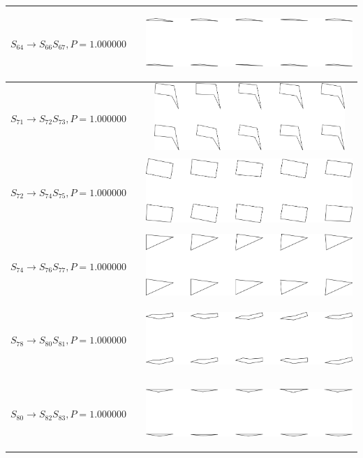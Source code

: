 \begin{tabular}{|l|c|c|}

\hline
$S_{64} \to S_{66} S_{67}, P=1.000000$ &  & \includegraphics[height=1in]{output/1.models/hand_built/romerchoice/gram.0036.sample.png} \\
\hline
$S_{71} \to S_{72} S_{73}, P=1.000000$ &  & \includegraphics[height=1in]{output/1.models/hand_built/romerchoice/gram.0037.sample.png} \\
\hline
$S_{72} \to S_{74} S_{75}, P=1.000000$ &  & \includegraphics[height=1in]{output/1.models/hand_built/romerchoice/gram.0038.sample.png} \\
\hline
$S_{74} \to S_{76} S_{77}, P=1.000000$ &  & \includegraphics[height=1in]{output/1.models/hand_built/romerchoice/gram.0039.sample.png} \\
\hline
$S_{78} \to S_{80} S_{81}, P=1.000000$ &  & \includegraphics[height=1in]{output/1.models/hand_built/romerchoice/gram.0040.sample.png} \\
\hline
$S_{80} \to S_{82} S_{83}, P=1.000000$ &  & \includegraphics[height=1in]{output/1.models/hand_built/romerchoice/gram.0041.sample.png} \\
\hline
\end{tabular}

